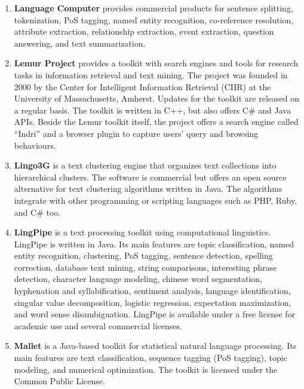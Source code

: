 \begin{enumerate}
	\item \textbf{Language Computer} \cite{lanuagecomputer} provides commercial products for sentence splitting, tokenization, PoS tagging, named entity recognition, co-reference resolution, attribute extraction, relationship extraction, event extraction, question answering, and text summarization.

	\item \textbf{Lemur Project} \cite{lemur} provides a toolkit with search engines and tools for research tasks in information retrieval and text mining. The project was founded in 2000 by the Center for Intelligent Information Retrieval (CIIR) at the University of Massachusetts, Amherst. Updates for the toolkit are released on a regular basis. The toolkit is written in C++, but also offers C\# and Java APIs. Beside the Lemur toolkit itself, the project offers a search engine called ``Indri'' and a browser plugin to capture users' query and browsing behaviours.

	\item \textbf{Lingo3G} \cite{lingo3g} is a text clustering engine that organizes text collections into hierarchical clusters.
The software is commercial but \cite{stefanowski2003carrot} offers an open source alternative for text clustering algorithms written in Java. The algorithms integrate with other programming or scripting languages such as PHP, Ruby, and C\# too.

	\item \textbf{LingPipe} \cite{lingpipe} is a text processing toolkit using computational linguistics. LingPipe is written in Java. Its main features are topic classification, named entity recognition, clustering, PoS tagging, sentence detection, spelling correction, database text mining, string comparisons, interesting phrase detection, character language modeling, chinese word segmentation, hyphenation and syllabification, sentiment analysis, language identification, singular value decomposition, logistic regression, expectation maximization, and word sense disambiguation.
LingPipe is available under a free license for academic use and several commercial licenses.

	\item \textbf{Mallet} \cite{mccallum2002mallet} is a Java-based toolkit for statistical natural language processing. Its main features are text classification, sequence tagging (PoS tagging), topic modeling, and numerical optimization.
The toolkit is licensed under the Common Public License.


\end{enumerate}
